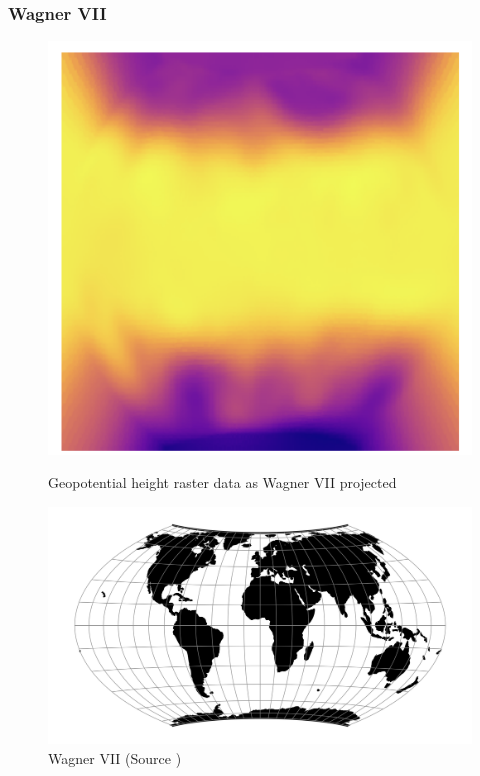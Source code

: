 \subsubsection*{Wagner VII}
\begin{figure}[h]
    \centering
    \begin{minipage}{0.30\textwidth}
        \centering
        \includegraphics[width=0.9\linewidth]{figures/chapter-8/geopoth_wag.png}
        \caption{ Geopotential height raster data as Wagner VII projected}
        \label{fig:wag_geopoth_raster}
    \end{minipage}\hfill
    \begin{minipage}{0.30\textwidth}
        \centering
        \includegraphics[width=0.9\linewidth]{figures/chapter-8/wag7.png}
        \caption{Wagner VII (Source \cite{PROJ_SITE})}
        \label{fig:wag_proj}
    \end{minipage}\hfill

\end{figure}
